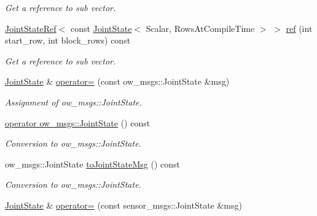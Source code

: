 \begin{DoxyCompactItemize}
\begin{DoxyCompactList}\small\item\em Get a reference to sub vector. \end{DoxyCompactList}\item 
\hyperlink{classow__core_1_1JointStateRef}{Joint\+State\+Ref}$<$ const \hyperlink{classow__core_1_1JointState}{Joint\+State}$<$ Scalar, Rows\+At\+Compile\+Time $>$ $>$ \hyperlink{classow__core_1_1JointState_a2cea91797dabf624c73678251fe65255}{ref} (int start\+\_\+row, int block\+\_\+rows) const \hypertarget{classow__core_1_1JointState_a2cea91797dabf624c73678251fe65255}{}\label{classow__core_1_1JointState_a2cea91797dabf624c73678251fe65255}

\begin{DoxyCompactList}\small\item\em Get a reference to sub vector. \end{DoxyCompactList}\item 
\hyperlink{classow__core_1_1JointState}{Joint\+State} \& \hyperlink{classow__core_1_1JointState_a658fea2a6b7656c9b7f632a8999df39a}{operator=} (const ow\+\_\+msgs\+::\+Joint\+State \&msg)\hypertarget{classow__core_1_1JointState_a658fea2a6b7656c9b7f632a8999df39a}{}\label{classow__core_1_1JointState_a658fea2a6b7656c9b7f632a8999df39a}

\begin{DoxyCompactList}\small\item\em Assignment of ow\+\_\+msgs\+::\+Joint\+State. \end{DoxyCompactList}\item 
\hyperlink{classow__core_1_1JointState_a11b905b14f9c33b5afe8352906c3eacd}{operator ow\+\_\+msgs\+::\+Joint\+State} () const \hypertarget{classow__core_1_1JointState_a11b905b14f9c33b5afe8352906c3eacd}{}\label{classow__core_1_1JointState_a11b905b14f9c33b5afe8352906c3eacd}

\begin{DoxyCompactList}\small\item\em Conversion to ow\+\_\+msgs\+::\+Joint\+State. \end{DoxyCompactList}\item 
ow\+\_\+msgs\+::\+Joint\+State \hyperlink{classow__core_1_1JointState_a1fd2a4028e7a62026f910b54bd974727}{to\+Joint\+State\+Msg} () const \hypertarget{classow__core_1_1JointState_a1fd2a4028e7a62026f910b54bd974727}{}\label{classow__core_1_1JointState_a1fd2a4028e7a62026f910b54bd974727}

\begin{DoxyCompactList}\small\item\em Conversion to ow\+\_\+msgs\+::\+Joint\+State. \end{DoxyCompactList}\item 
\hyperlink{classow__core_1_1JointState}{Joint\+State} \& \hyperlink{classow__core_1_1JointState_a48241c3ae8afada83255b56bedec192e}{operator=} (const sensor\+\_\+msgs\+::\+Joint\+State \&msg)\hypertarget{classow__core_1_1JointState_a48241c3ae8afada83255b56bedec192e}{}\label{classow__core_1_1JointState_a48241c3ae8afada83255b56bedec192e}


\end{DoxyCompactItemize}
